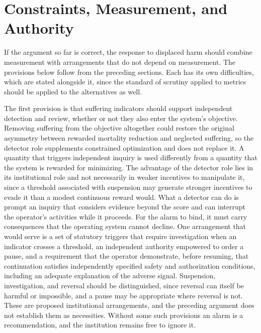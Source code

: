 \documentclass[11pt]{article}
\begin{document}
\section{Constraints, Measurement, and Authority}

If the argument so far is correct, the response to displaced harm should combine measurement with arrangements that do not depend on measurement. The provisions below follow from the preceding sections. Each has its own difficulties, which are stated alongside it, since the standard of scrutiny applied to metrics should be applied to the alternatives as well.

The first provision is that suffering indicators should support independent detection and review, whether or not they also enter the system's objective. Removing suffering from the objective altogether could restore the original asymmetry between rewarded mortality reduction and neglected suffering, so the detector role supplements constrained optimization and does not replace it. A quantity that triggers independent inquiry is used differently from a quantity that the system is rewarded for minimizing. The advantage of the detector role lies in its institutional role and not necessarily in weaker incentives to manipulate it, since a threshold associated with suspension may generate stronger incentives to evade it than a modest continuous reward would. What a detector can do is prompt an inquiry that considers evidence beyond the score and can interrupt the operator's activities while it proceeds. For the alarm to bind, it must carry consequences that the operating system cannot decline. One arrangement that would serve is a set of statutory triggers that require investigation when an indicator crosses a threshold, an independent authority empowered to order a pause, and a requirement that the operator demonstrate, before resuming, that continuation satisfies independently specified safety and authorization conditions, including an adequate explanation of the adverse signal. Suspension, investigation, and reversal should be distinguished, since reversal can itself be harmful or impossible, and a pause may be appropriate where reversal is not. These are proposed institutional arrangements, and the preceding argument does not establish them as necessities. Without some such provisions an alarm is a recommendation, and the institution remains free to ignore it.
\end{document}

